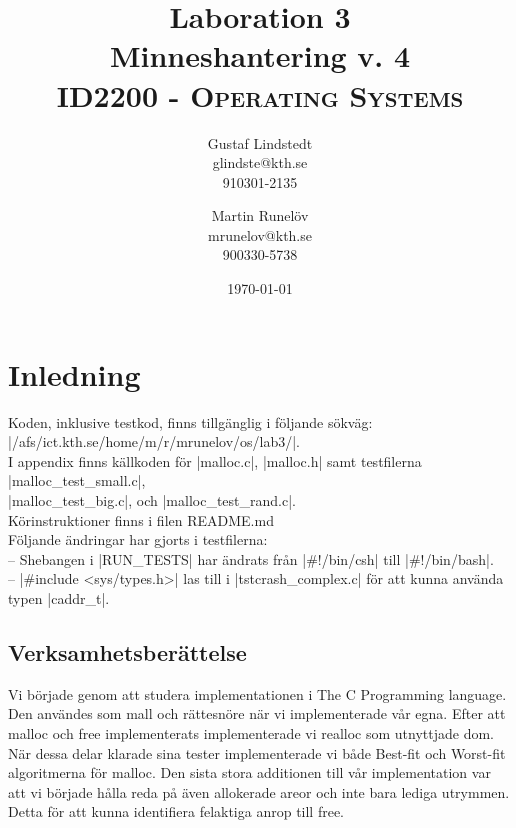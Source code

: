 \documentclass[paper=a4, fontsize=11pt]{scrartcl} %
\title{ 
\huge Laboration 3 \\ Minneshantering v. 4 \\ %
\vspace{10pt}
\normalfont \normalsize 
\textsc{ID2200 - Operating Systems } \\ [25pt] %
}
\author{Gustaf Lindstedt \\ glindste@kth.se \\ 910301-2135 \and Martin Runelöv \\ mrunelov@kth.se \\ 900330-5738}
\date{\vspace{8pt}\normalsize\today} %
\numberwithin{equation}{section} %
\numberwithin{figure}{section} %
\numberwithin{table}{section} %
\begin{document}
\maketitle

\section{Inledning}

Koden, inklusive testkod, finns tillgänglig i följande sökväg:\\
|/afs/ict.kth.se/home/m/r/mrunelov/os/lab3/|. \\

I appendix finns källkoden för |malloc.c|, |malloc.h| samt testfilerna |malloc_test_small.c|,\\ |malloc_test_big.c|, och |malloc_test_rand.c|. \\

Körinstruktioner finns i filen README.md\\

Följande ändringar har gjorts i testfilerna:\\
-- Shebangen i |RUN_TESTS| har ändrats från |#!/bin/csh| till |#!/bin/bash|.\\
-- |#include <sys/types.h>| las till i |tstcrash_complex.c| för att kunna
använda typen |caddr_t|.



\subsection{Verksamhetsberättelse}

Vi började genom att studera implementationen i The C Programming language.
Den användes som mall och rättesnöre när vi implementerade vår egna.
Efter att malloc och free implementerats implementerade vi realloc som
utnyttjade dom.
När dessa delar klarade sina tester implementerade vi både Best-fit och
Worst-fit algoritmerna för malloc.
Den sista stora additionen till vår implementation var att vi började hålla
reda på även allokerade areor och inte bara lediga utrymmen.
Detta för att kunna identifiera felaktiga anrop till free. \\
\end{document}
